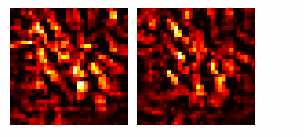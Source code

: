 \documentclass[preprint,12pt]{elsarticle}
\begin{document}
\begin{figure}[p]
\begin{tabular}{cccccc}
  \includegraphics[scale=\scale]{../visualizations/examples/cifar10/cnn/positive_saliency_map/4.png} & 
  \includegraphics[scale=\scale]{../visualizations/examples/cifar10/cnn/negative_saliency_map/4.png} & 

\end{tabular}
\end{figure}
\end{document}
